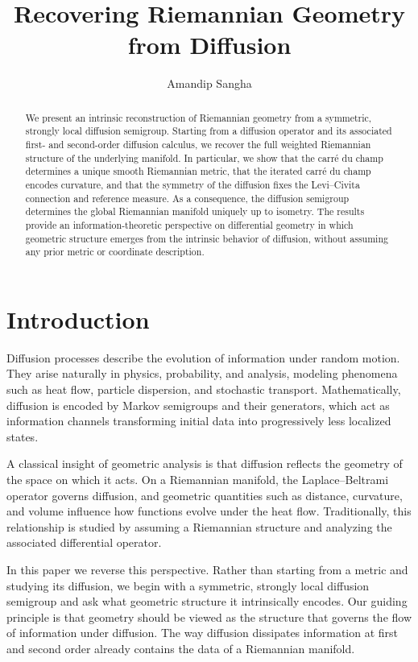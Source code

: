 \documentclass[11pt]{amsart}
\title[Recovering Riemannian Geometry from Diffusion]
{Recovering Riemannian Geometry from Diffusion}
\author{Amandip Sangha}
\theoremstyle{definition}
\theoremstyle{remark}
\begin{document}
\begin{abstract}
We present an intrinsic reconstruction of Riemannian geometry from a symmetric,
strongly local diffusion semigroup.
Starting from a diffusion operator and its associated first- and second-order
diffusion calculus, we recover the full weighted Riemannian structure of the
underlying manifold.
In particular, we show that the carré du champ determines a unique smooth
Riemannian metric, that the iterated carré du champ encodes curvature, and that
the symmetry of the diffusion fixes the Levi--Civita connection and reference
measure.
As a consequence, the diffusion semigroup determines the global Riemannian
manifold uniquely up to isometry.
The results provide an information-theoretic perspective on differential
geometry in which geometric structure emerges from the intrinsic behavior of
diffusion, without assuming any prior metric or coordinate description.
\end{abstract}


\maketitle
\tableofcontents

\section{Introduction}

Diffusion processes describe the evolution of information under random motion.
They arise naturally in physics, probability, and analysis, modeling phenomena
such as heat flow, particle dispersion, and stochastic transport.
Mathematically, diffusion is encoded by Markov semigroups and their generators,
which act as information channels transforming initial data into progressively
less localized states.

A classical insight of geometric analysis is that diffusion reflects the geometry
of the space on which it acts.
On a Riemannian manifold, the Laplace--Beltrami operator governs diffusion, and
geometric quantities such as distance, curvature, and volume influence how
functions evolve under the heat flow.
Traditionally, this relationship is studied by assuming a Riemannian structure
and analyzing the associated differential operator.

In this paper we reverse this perspective.
Rather than starting from a metric and studying its diffusion, we begin with a
symmetric, strongly local diffusion semigroup and ask what geometric structure
it intrinsically encodes.
Our guiding principle is that geometry should be viewed as the structure that
governs the flow of information under diffusion.
The way diffusion dissipates information at first and second order already
contains the data of a Riemannian manifold.
\end{document}
